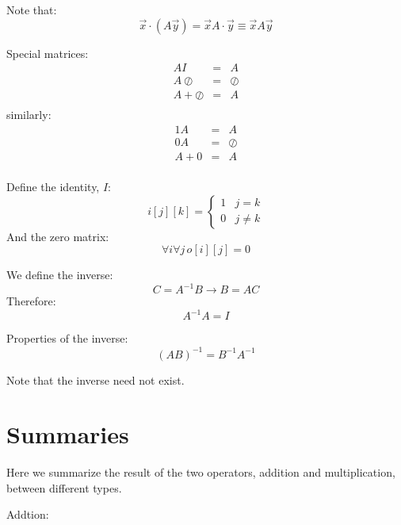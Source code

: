 \documentclass{article}
\newcommand{\inner}{\cdot}
\newcommand{\zeromatrix}{\oslash}
\newcommand{\identity}{I}
\begin{document}
Note that:
\begin{equation}
	\vec x \inner (A \vec y) = \vec x A \inner \vec y \equiv \vec x A \vec y
\end{equation}

Special matrices:
\begin{eqnarray}
	A \identity & = & A \\
	A \zeromatrix & = & \zeromatrix \\
	A + \zeromatrix & = & A \\
\end{eqnarray}
similarly:
\begin{eqnarray}
	1 A & = & A \\
	0 A & = & \zeromatrix \\
	A + 0 & = & A \\
\end{eqnarray}

Define the identity, $\identity$:
\begin{equation}
	i[j][k] = \left \lbrace \begin{array}{lr}
	1 & j = k \\
	0 & j \ne k
\end{array} \right .
\end{equation}
And the zero matrix:
\begin{equation}
	\forall i \forall j \, o[i][j]=0
\end{equation}

We define the inverse:
\begin{equation}
	C = A^{-1} B \rightarrow B = A C
\end{equation}
Therefore:
\begin{equation}
	A^{-1} A = \identity
\end{equation}

Properties of the inverse:
\begin{equation}
	(A B)^{-1} = B^{-1} A^{-1}
\end{equation}

Note that the inverse need not exist.

\section{Summaries}

\label{summary}

Here we summarize the result of the two operators, addition and multiplication,
between different types.

Addtion:
\end{document}
